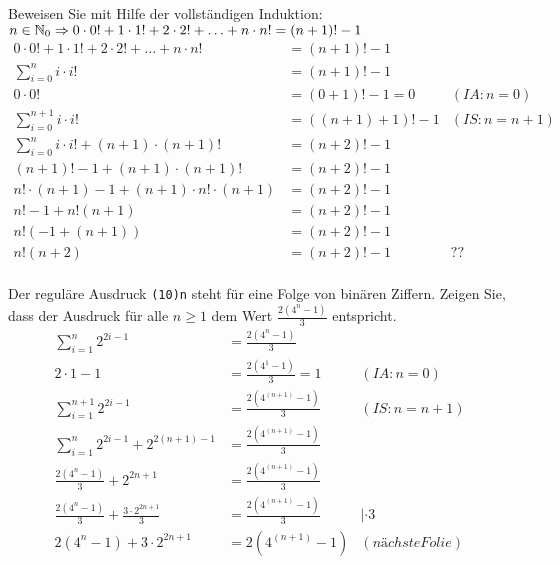 \begin{card}
  Beweisen Sie mit Hilfe der vollständigen Induktion:\\
  $n \in \mathbb{N}_0 \Rightarrow 0 \cdot 0! + 1 \cdot 1! + 2 \cdot 2! + \ldots + n \cdot n! = (n+1)!-1$
  \hr
  \begin{align*}
    0 \cdot 0! + 1 \cdot 1! + 2 \cdot 2! + \ldots + n \cdot n! &= (n+1)!-1 & \\
    \sum\limits_{i=0}^{n} i \cdot i! &= (n+1)!-1 & \\
    0 \cdot 0! &= (0+1)!-1 = 0 & (IA: n=0) \\
    \sum\limits_{i=0}^{n+1} i \cdot i! &= ((n+1)+1)!-1 & (IS: n=n+1) \\
    \sum\limits_{i=0}^{n} i \cdot i! + (n+1) \cdot (n+1)! &= (n+2)!-1 & \\
    (n+1)! - 1 + (n+1) \cdot (n+1)! &= (n+2)!-1 & \\
    n! \cdot (n+1) - 1 + (n+1) \cdot n! \cdot (n+1) &= (n+2)!-1 & \\
    n! - 1 + n!(n+1) &= (n+2)!-1 & \\
    n!(-1 + (n+1)) &= (n+2)!-1 & \\
    n!(n+2) &= (n+2)!-1 & ?? \\
  \end{align*}
\end{card}

\begin{card}
  Der reguläre Ausdruck \texttt{(10){n}} steht für eine Folge von binären Ziffern. Zeigen Sie, dass der Ausdruck für alle
  $n \geq 1$ dem Wert $\frac{2(4^n - 1)}{3}$ entspricht.
  \hr
  \begin{align*}
    \sum\limits_{i=1}^{n} 2^{2i-1} &= \frac{2(4^n - 1)}{3} & \\
    2 \cdot 1 - 1 &= \frac{2(4^1 - 1)}{3} = 1 & (IA: n=0) \\
    \sum\limits_{i=1}^{n+1} 2^{2i-1} &= \frac{2(4^{(n+1)} - 1)}{3} & (IS: n=n+1) \\
    \sum\limits_{i=1}^{n} 2^{2i-1} + 2^{2(n+1) - 1} &= \frac{2(4^{(n+1)} - 1)}{3} & \\
    \frac{2(4^{n} - 1)}{3} + 2^{2n+1} &= \frac{2(4^{(n+1)} - 1)}{3} & \\
    \frac{2(4^{n} - 1)}{3} + \frac{3 \cdot 2^{2n+1}}{3} &= \frac{2(4^{(n+1)} - 1)}{3} & |\cdot 3 \\
    2(4^{n} - 1) + 3 \cdot 2^{2n+1} &= 2(4^{(n+1)} - 1) & (nächste Folie) \\
  \end{align*}
\end{card}

